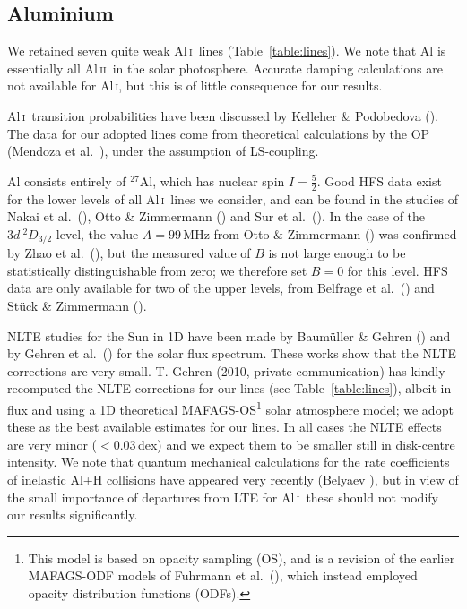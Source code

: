 \documentclass[traditabstract]{aa}
\newcommand{\altali}{Al\,\textsc{i}}
\newcommand{\altalii}{Al\,\textsc{ii}}
\newcommand{\ali}{\altali\ }
\newcommand{\alii}{\altalii\ }
\begin{document}
\subsection{Aluminium}
We retained seven quite weak \ali lines (Table~\ref{table:lines}). We note that Al is essentially all \alii in the solar photosphere.  Accurate damping calculations are not available for \altali, but this is of little consequence for our results.

\ali transition probabilities have been discussed by Kelleher \& Podobedova (\cite{kel2}).  The data for our adopted lines come from theoretical calculations by the OP (Mendoza et al.\ \cite{mend}), under the assumption of LS-coupling.  

Al consists entirely of $^{27}$Al, which has nuclear spin $I=\frac52$.  Good HFS data exist for the lower levels of all \ali lines we consider, and can be found in the studies of Nakai et al.\ (\cite{Nakai07}), Otto \& Zimmermann (\cite{Otto69}) and Sur et al.\ (\cite{Sur05}).  In the case of the $3d\ ^2D_{3/2}$ level, the value $A=99$\,MHz from Otto \& Zimmermann (\cite{Otto69}) was confirmed by Zhao et al.\ (\cite{Zhao86}), but the measured value of $B$ is not large enough to be statistically distinguishable from zero; we therefore set \mbox{$B=0$} for this level.  HFS data are only available for two of the upper levels, from Belfrage et al.\ (\cite{Belfrage84}) and St\"uck \& Zimmermann (\cite{Stueck70}).

NLTE studies for the Sun in 1D have been made by Baum\"uller \& Gehren (\cite{bau2}) and by Gehren et al.\ (\cite{gehr}) for the solar flux spectrum. These works show that the NLTE corrections are very small. T. Gehren (2010, private communication) has kindly recomputed the NLTE corrections for our lines (see Table~\ref{table:lines}), albeit in flux and using a 1D theoretical MAFAGS-OS\footnote{This model is based on opacity sampling (OS), and is a revision of the earlier MAFAGS-ODF models of Fuhrmann et al.\ (\cite{Fuhrmann97}), which instead employed opacity distribution functions (ODFs).} solar atmosphere model; we adopt these as the best available estimates for our lines. In all cases the NLTE effects are very minor ($<$$0.03$\,dex) and we expect them to be smaller still in disk-centre intensity. We note that quantum mechanical calculations for the rate coefficients of inelastic Al+H collisions have appeared very recently (Belyaev \cite{belyaev_al}), but in view of the small importance of departures from LTE for \ali these should not modify our results significantly.
\end{document}
